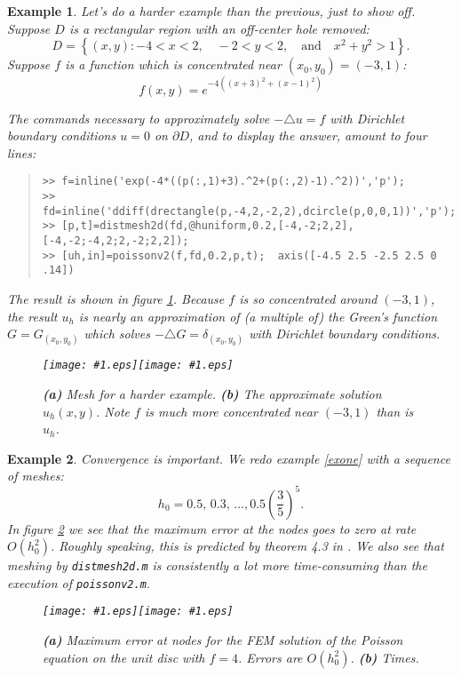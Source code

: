 \documentclass[12pt]{amsart}
\newtheorem{example}{Example}
\theoremstyle{definition}
\newcommand{\mtt}{\texttt}
\newcommand{\regfigure}[2]{\texttt{[image: \#1.eps]}}
\newcommand{\lap}{\triangle}
\begin{document}
\begin{example}  Let's do a harder example than the previous, just to show off.  Suppose $D$ is a rectangular region with an off-center hole removed:
    $$D=\left\{(x,y) : -4<x<2, \quad -2<y<2, \quad \text{and} \quad x^2+y^2>1\right\}.$$
Suppose $f$ is a function which is concentrated near $(x_0,y_0)=(-3,1)$:
    $$f(x,y)=e^{-4((x+3)^2+(x-1)^2)}$$

The commands necessary to approximately solve $-\lap u=f$ with Dirichlet boundary conditions $u=0$ on $\partial D$, and to display the answer, amount to four lines:
\small\begin{quote}\begin{verbatim}
>> f=inline('exp(-4*((p(:,1)+3).^2+(p(:,2)-1).^2))','p');
>> fd=inline('ddiff(drectangle(p,-4,2,-2,2),dcircle(p,0,0,1))','p');
>> [p,t]=distmesh2d(fd,@huniform,0.2,[-4,-2;2,2],[-4,-2;-4,2;2,-2;2,2]);
>> [uh,in]=poissonv2(f,fd,0.2,p,t);  axis([-4.5 2.5 -2.5 2.5 0 .14])
\end{verbatim}
\end{quote}\normalsize

The result is shown in figure \ref{hard}.  Because $f$ is so concentrated around $(-3,1)$, the result $u_h$ is nearly an approximation of (a multiple of) the Green's function $G=G_{(x_0,y_0)}$ which solves $-\lap G = \delta_{(x_0,y_0)}$ with Dirichlet boundary conditions.

\begin{figure}[h]
\regfigure{hardmesh}{2.7}\regfigure{hardpoisson}{2.7}
\caption{\textbf{(a)} Mesh for a harder example. \textbf{(b)} The approximate solution $u_h(x,y)$.  Note $f$ is \emph{much} more concentrated near $(-3,1)$ than is $u_h$.  }\label{hard}
\end{figure}
\end{example}

\begin{example}  Convergence is important.  We redo example \ref{exone} with a sequence of meshes:
    $$h_0 = 0.5, \, 0.3, \, \dots, 0.5 \left(\frac{3}{5}\right)^5.$$
In figure \ref{conv} we see that the maximum error at the nodes goes to zero at rate $O(h_0^2)$.  Roughly speaking, this is predicted by theorem 4.3 in \cite{Johnson}.  We also see that meshing by \emph{\mtt{distmesh2d.m}} is consistently a lot more time-consuming than the execution of \emph{\mtt{poissonv2.m}}.

\begin{figure}[h]
\regfigure{poiserr}{2.4}\regfigure{poistime}{2.4}
\caption{\textbf{(a)} Maximum error at nodes for the FEM solution of the Poisson equation on the unit disc with $f=4$.  Errors are $O(h_0^2)$. \textbf{(b)} Times.}\label{conv}
\end{figure}
\end{example}
\end{document}
